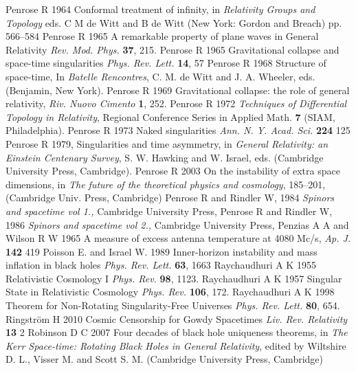 \documentclass[12pt]{iopart}
\begin{document}
\begin{thebibliography}{999}
 Penrose R 1964 Conformal treatment of infinity, in {\it Relativity Groups and Topology} eds. C M de Witt and
B de Witt (New York: Gordon and Breach) pp. 566--584
 Penrose R 1965 A remarkable property of plane waves in General Relativity {\it Rev. Mod. Phys.} {\bf 37}, 215.
 Penrose R 1965 Gravitational 
collapse and space-time singularities {\it Phys. Rev. Lett.} {\bf 14}, 57
 Penrose R 1968 Structure of space-time, In {\it Batelle Rencontres}, C. M. de Witt and J. A. Wheeler, eds. (Benjamin, New York).
 Penrose R 1969 Gravitational collapse: the role of general
relativity,  {\it Riv. Nuovo Cimento} {\bf 1}, 252.%
 Penrose R 1972 {\it Techniques of Differential Topology in
Relativity}, Regional Conference Series in Applied Math. {\bf 7}
(SIAM, Philadelphia).
 Penrose R 1973 Naked singularities {\it Ann. N. Y. Acad. Sci.} {\bf 224} 125%
 Penrose R 1979, Singularities and time asymmetry, in {\it General Relativity: an Einstein
Centenary Survey}, S. W. Hawking and W. Israel, eds.
(Cambridge University Press, Cambridge).%
 Penrose R 2003 On the instability of extra space dimensions, in {\it The future of the theoretical physics and cosmology}, 185--201, (Cambridge Univ. Press, Cambridge)
    Penrose R and Rindler W, 1984
    \textit{Spinors and spacetime vol 1.,}
    Cambridge University Press,
    Penrose R and Rindler W, 1986
    \textit{Spinors and spacetime vol 2.,}
    Cambridge University Press,
 Penzias A A and Wilson R W 1965 A measure of excess antenna temperature at 4080 Mc/s, {\it Ap. J.} {\bf 142} 419
 Poisson E. and Israel W. 1989 Inner-horizon instability and mass inflation in black holes {\it Phys. Rev. Lett.} {\bf 63}, 1663
 Raychaudhuri A K 1955 Relativistic Cosmology I {\it Phys. Rev.} {\bf 98}, 1123.
 Raychaudhuri A K 1957 Singular State in Relativistic Cosmology {\it Phys. Rev.} {\bf 106},
172.%
 Raychaudhuri A K 1998 Theorem for 
Non-Rotating Singularity-Free Universes {\it Phys. Rev. Lett.} {\bf 80}, 654.
 Ringstr\"om H 2010 Cosmic Censorship for Gowdy Spacetimes {\it Liv. Rev. Relativity} {\bf 13} 2
 Robinson D C 2007 Four decades of black hole uniqueness
theorems,  in {\it The Kerr Space-time: Rotating Black Holes in General Relativity}, edited by
Wiltshire D. L., Visser M. and Scott S. M. (Cambridge University Press, Cambridge)

\end{thebibliography}
\end{document}
